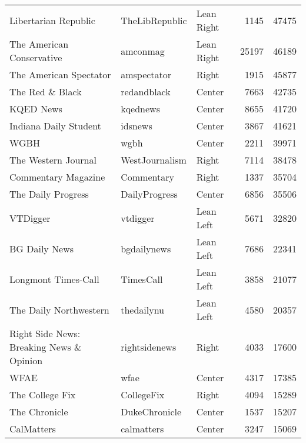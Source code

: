 \begin{tabular}{lllrr}
                     Libertarian Republic &   TheLibRepublic &    Lean Right &              1145 &      47475 \\
                The American Conservative &         amconmag &    Lean Right &             25197 &      46189 \\
                   The American Spectator &      amspectator &         Right &              1915 &      45877 \\
                          The Red \& Black &      redandblack &        Center &              7663 &      42735 \\
                                KQED News &         kqednews &        Center &              8655 &      41720 \\
                    Indiana Daily Student &          idsnews &        Center &              3867 &      41621 \\
                                     WGBH &             wgbh &        Center &              2211 &      39971 \\
                      The Western Journal &   WestJournalism &         Right &              7114 &      38478 \\
                      Commentary Magazine &       Commentary &         Right &              1337 &      35704 \\
                       The Daily Progress &    DailyProgress &        Center &              6856 &      35506 \\
                                 VTDigger &         vtdigger &     Lean Left &              5671 &      32820 \\
                            BG Daily News &      bgdailynews &     Lean Left &              7686 &      22341 \\
                      Longmont Times-Call &        TimesCall &     Lean Left &              3858 &      21077 \\
                   The Daily Northwestern &       thedailynu &     Lean Left &              4580 &      20357 \\
 Right Side News: Breaking News \& Opinion &    rightsidenews &         Right &              4033 &      17600 \\
                                     WFAE &             wfae &        Center &              4317 &      17385 \\
                          The College Fix &       CollegeFix &         Right &              4094 &      15289 \\
                            The Chronicle &    DukeChronicle &        Center &              1537 &      15207 \\
                               CalMatters &       calmatters &        Center &              3247 &      15069 \\
\bottomrule
\end{tabular}
